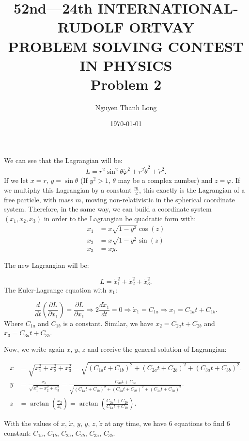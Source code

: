 \documentclass[12pt]{article}
\title{52nd—24th INTERNATIONAL-RUDOLF ORTVAY \\ PROBLEM SOLVING CONTEST IN PHYSICS \\ Problem 2}
\author{Nguyen Thanh Long}
\date{\today}
\begin{document}
	
\maketitle
	
\noindent We can see that the Lagrangian will be:
$$ L = r^2 \sin^2 \theta \dot{\varphi}^2 + r^2 \dot{\theta}^2 + \dot{r}^2 .$$
If we let $x=r$, $y = \sin \theta $ (If $y^2>1$, $\theta$ may be a complex number) and $z = \varphi $. If we multiphy this Lagrangian by a constant $\frac{m}{2}$, this exactly is the Lagrangian of a free particle, with mass $m$, moving non-relativistic in the spherical coordinate system. Therefore, in the same way, we can build a coordinate system $(x_1, x_2, x_3)$ in order to the Lagrangian be quadratic form with: 
\begin{align*}
	x_1 & = x \sqrt{1-y^2} \cos ( z) \\
	x_2 & = x \sqrt{1-y^2} \sin ( z) \\
	x_3 & = xy.
\end{align*}	

\noindent The new Lagrangian will be:

$$ L = \dot{x}_1^2 + \dot{x}_2^2 + \dot{x}_3^2 .$$
The Euler-Lagrange equation with $x_1$:

$$ \frac{d}{dt} \left( \frac{ \partial L}{\partial \dot{x}_1 } \right) = \frac{ \partial L}{ \partial x_1} \Rightarrow 2 \frac{d \dot{x}_1}{dt} = 0 \Rightarrow \dot{x}_1 = C_{1a} \Rightarrow x_1 = C_{1a} t + C_{1b}.$$
Where $C_{1a}$ and $C_{1b}$ is a constant. Similar, we have $x_2 = C_{2a} t + C_{2b}$ and $ x_3 = C_{3a} t + C_{3b}$.

\noindent Now, we write again $x$, $y$, $z$ and receive the general solution of Lagrangian:

\begin{align*}
	x & = \sqrt{x_1^2 + x_2^2 + x_3^2} = \sqrt{\left( C_{1a} t + C_{1b} \right)^2 + \left( C_{2a} t + C_{2b} \right)^2 +\left( C_{3a} t + C_{3b} \right)^2 }. \\
	y & = \frac{x_3}{\sqrt{x_1^2 + x_2^2 + x_3^2}} = \frac{C_{3a} t + C_{3b}}{\sqrt{\left( C_{1a} t + C_{1b} \right)^2 + \left( C_{2a} t + C_{2b} \right)^2 +\left( C_{3a} t + C_{3b} \right)^2 }} . \\
	z & = \arctan \left( \frac{x_2}{x_1} \right) = \arctan \left( \frac{ C_{2a} t + C_{2b} }{ C_{1a} t + C_{1b} } \right) .
\end{align*}

\noindent With the values of $x$, $\dot{x}$, $y$, $\dot{y}$, $z$, $\dot{z}$ at any time, we have 6 equations to find 6 constant: $C_{1a}$, $C_{1b}$, $C_{2a}$, $C_{2b}$, $C_{3a}$, $C_{3b}$.
\end{document}
